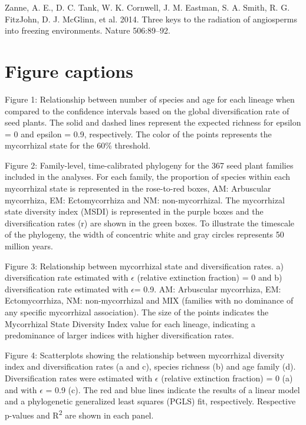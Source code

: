 \documentclass[12pt,]{article}
\begin{document}
\leavevmode\hypertarget{ref-zanne_2014}{}%
Zanne, A. E., D. C. Tank, W. K. Cornwell, J. M. Eastman, S. A. Smith, R.
G. FitzJohn, D. J. McGlinn, et al. 2014. Three keys to the radiation of
angiosperms into freezing environments. Nature 506:89--92.

\newpage

\hypertarget{figure-captions}{%
\section{Figure captions}\label{figure-captions}}

Figure 1: Relationship between number of species and age for each
lineage when compared to the confidence intervals based on the global
diversification rate of seed plants. The solid and dashed lines
represent the expected richness for epsilon = 0 and epsilon = 0.9,
respectively. The color of the points represents the mycorrhizal state
for the 60\% threshold.

Figure 2: Family-level, time-calibrated phylogeny for the 367 seed plant
families included in the analyses. For each family, the proportion of
species within each mycorrhizal state is represented in the rose-to-red
boxes, AM: Arbuscular mycorrhiza, EM: Ectomycorrhiza and NM:
non-mycorrhizal. The mycorrhizal state diversity index (MSDI) is
represented in the purple boxes and the diversification rates (r) are
shown in the green boxes. To illustrate the timescale of the phylogeny,
the width of concentric white and gray circles represents 50 million
years.

Figure 3: Relationship between mycorrhizal state and diversification
rates. a) diversification rate estimated with \(\epsilon\) (relative
extinction fraction) = 0 and b) diversification rate estimated with
\(\epsilon\)= 0.9. AM: Arbuscular mycorrhiza, EM: Ectomycorrhiza, NM:
non-mycorrhizal and MIX (families with no dominance of any specific
mycorrhizal association). The size of the points indicates the
Mycorrhizal State Diversity Index value for each lineage, indicating a
predominance of larger indices with higher diversification rates.

Figure 4: Scatterplots showing the relationship between mycorrhizal
diversity index and diversification rates (a and c), species richness
(b) and age family (d). Diversification rates were estimated with
\(\epsilon\) (relative extinction fraction) = 0 (a) and with
\(\epsilon\) = 0.9 (c). The red and blue lines indicate the results of a
linear model and a phylogenetic generalized least squares (PGLS) fit,
respectively. Respective p-values and R\textsuperscript{2} are shown in
each panel.
\end{document}
